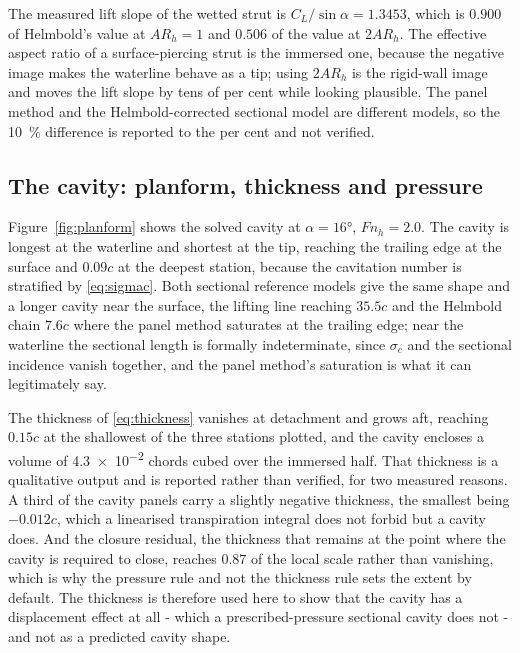 \documentclass[11pt,a4paper]{article}
\newcommand{\Fnh}{\mathit{Fn}_h}
\newcommand{\ARh}{\mathit{AR}_h}
\begin{document}
The measured lift slope of the wetted strut is $C_L/\sin\alpha = 1.3453$, which
is $0.900$ of Helmbold's value at $\ARh = 1$ and $0.506$ of the value at
$2\ARh$. The effective aspect ratio of a surface-piercing strut is the immersed
one, because the negative image makes the waterline behave as a tip; using
$2\ARh$ is the rigid-wall image and moves the lift slope by tens of per cent
while looking plausible. The panel method and the Helmbold-corrected sectional
model are different models, so the \SI{10}{\percent} difference is reported to
the per cent and not verified.

\subsection{The cavity: planform, thickness and pressure}
\label{subsec:CavityResults}

Figure~\ref{fig:planform} shows the solved cavity at $\alpha = \ang{16}$,
$\Fnh = 2.0$. The cavity is longest at the waterline and shortest at the tip,
reaching the trailing edge at the surface and $0.09c$ at the deepest station,
because the cavitation number is stratified by \eqref{eq:sigmac}. Both sectional
reference models give the same shape and a longer cavity near the surface, the
lifting line reaching $35.5c$ and the Helmbold chain $7.6c$ where the panel method
saturates at the trailing edge; near the waterline the sectional length is
formally indeterminate, since $\sigma_c$ and the sectional incidence vanish
together, and the panel method's saturation is what it can legitimately say.

The thickness of \eqref{eq:thickness} vanishes at detachment and grows aft, reaching $0.15c$ at the
shallowest of the three stations plotted, and the cavity encloses a volume of
\num{4.3e-2} chords cubed over the immersed half. That thickness is a qualitative
output and is reported rather than verified, for two measured reasons. A third of
the cavity panels carry a slightly negative thickness, the smallest being
$-0.012c$, which a linearised transpiration integral does not forbid but a cavity
does. And the closure residual, the thickness that remains at the point where the
cavity is required to close, reaches $0.87$ of the local scale rather than
vanishing, which is why the pressure rule and not the thickness rule sets the
extent by default. The thickness is therefore used here to show that the cavity
has a displacement effect at all - which a prescribed-pressure sectional cavity
does not - and not as a predicted cavity shape.
\end{document}
